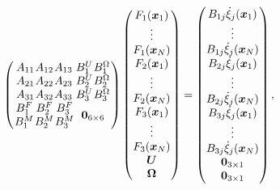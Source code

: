 \begin{equation}
\label{eq:mobilityStructure}
\arraycolsep=0.4pt\def\arraystretch{1}
\left(
\begin{array}{cc}
\begin{array}{ccc}
A_{11} & A_{12} & A_{13} \\
A_{21} & A_{22} & A_{23} \\
A_{31} & A_{32} & A_{33}
\end{array} &
\begin{array}{cc}
B_{1}^{U} & B_{1}^{\Omega} \\
B_{2}^{U} & B_{2}^{\Omega} \\
B_{3}^{U} & B_{3}^{\Omega} \\
\end{array} \\
\begin{array}{ccc}
B_{1}^{F} & B_{2}^{F} & B_{3}^{F} \\
B_{1}^{M} & B_{2}^{M} & B_{3}^{M}
\end{array} & \bm{0}_{6 \times 6}
\end{array}
\right)
\left(\begin{array}{c}
F_{1}({\bm{x}}_{1}) \\
\vdots \\
F_{1}({\bm{x}}_{N}) \\
F_{2}({\bm{x}}_{1}) \\
\vdots \\
F_{2}({\bm{x}}_{N}) \\
F_{3}({\bm{x}}_{1}) \\
\vdots \\
F_{3}({\bm{x}}_{N}) \\
\boldsymbol{U} \\
\boldsymbol{\Omega}
\end{array}\right)=\left(\begin{array}{c}
B_{1 j} \dot{\xi}_{j}({\bm{x}}_{1}) \\
\vdots \\
B_{1 j} \dot{\xi}_{j}({\bm{x}}_{N}) \\
B_{2 j} \dot{\xi}_{j}({\bm{x}}_{1}) \\
\vdots \\
B_{2 j} \dot{\xi}_{j}({\bm{x}}_{N}) \\
B_{3 j} \dot{\xi}_{j}({\bm{x}}_{1}) \\
\vdots \\
B_{3 j}\dot{\xi}_{j}({\bm{x}}_{N}) \\
\mathbf{0}_{3 \times 1} \\
\mathbf{0}_{3 \times 1}
\end{array}\right),
\end{equation}

